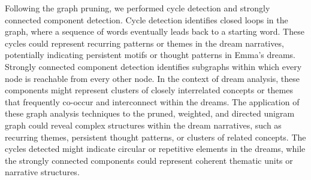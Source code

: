 Following the graph pruning, we performed cycle detection and strongly connected component detection. Cycle detection identifies closed loops in the graph, where a sequence of words eventually leads back to a starting word. These cycles could represent recurring patterns or themes in the dream narratives, potentially indicating persistent motifs or thought patterns in Emma's dreams. Strongly connected component detection identifies subgraphs within which every node is reachable from every other node. In the context of dream analysis, these components might represent clusters of closely interrelated concepts or themes that frequently co-occur and interconnect within the dreams. The application of these graph analysis techniques to the pruned, weighted, and directed unigram graph could reveal complex structures within the dream narratives, such as recurring themes, persistent thought patterns, or clusters of related concepts. The cycles detected might indicate circular or repetitive elements in the dreams, while the strongly connected components could represent coherent thematic units or narrative structures.